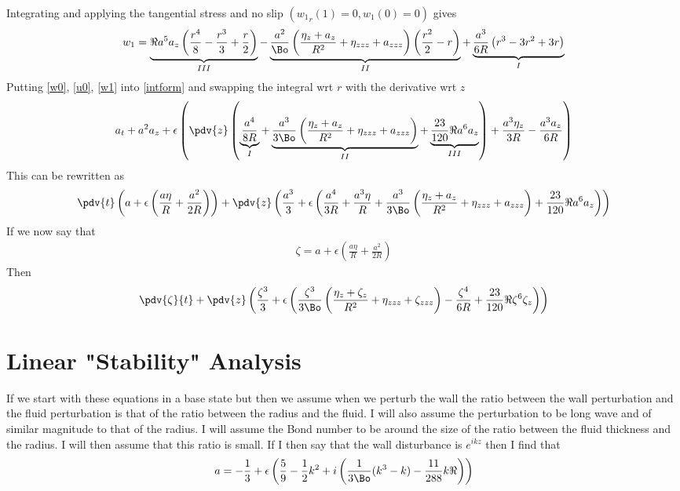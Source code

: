 \documentclass[12pt]{article}
\begin{document}
Integrating and applying the tangential stress and no slip $({w_1}_r(1)= 0, w_1(0) = 0)$ gives 
\begin{align}
w_1 = \underbrace{\Re a^5a_z\left(\frac{r^4}{8} - \frac{r^3}{3}+\frac{r}{2}\right)}_{III}-\underbrace{\frac{a^2}{\Bo}\left(\frac{\eta_z + a_z}{R^2} + \eta_{zzz} +a_{zzz}\right)\left(\frac{r^2}{2} - r\right)}_{II} + \underbrace{\frac{a^3}{6R}\left( r^3-3r^2+3r\right)}_I \label{w1}
\end{align}
 Putting \eqref{w0}, \eqref{u0},  \eqref{w1} into \eqref{intform} and swapping the integral wrt $r$ with the derivative wrt $z$
\begin{align}
a_t + a^2a_z+ \epsilon\left(\pdv{z}\left(\underbrace{\frac{a^4}{8R}}_{I}+\underbrace{ \frac{a^3}{3\Bo}\left(\frac{\eta_z + a_z}{R^2} + \eta_{zzz}+ a_{zzz}\right)}_{II}+\underbrace{\frac{23}{120}\Re a^6a_z}_{III}\right)+\frac{a^3\eta_z}{3R}- \frac{a^3 a_z}{6R}\right)
\end{align}
This can be rewritten as 
\begin{align}
\pdv{t}\left(a + \epsilon\left(\frac{a\eta}{R}+ \frac{a^2}{2R}\right)\right) + \pdv{z}\left(\frac{a^3}{3}+\epsilon\left(\frac{a^4}{3R}+\frac{a^3\eta}{R}+ \frac{a^3}{3\Bo}\left(\frac{\eta_z + a_z}{R^2} + \eta_{zzz}+ a_{zzz}\right)+\frac{23}{120}\Re a^6a_z\right)\right)
\end{align}
If we now say that \begin{align}
\zeta= a + \epsilon\left(\frac{a\eta}{R}+ \frac{a^2}{2R}\right)
\end{align}
Then
\begin{align}
\pdv{\zeta}{t}+ \pdv{z}\left(\frac{\zeta^3}{3}+\epsilon\left(\frac{\zeta^3}{3\Bo}\left(\frac{\eta_z+\zeta_z}{R^2}+\eta_{zzz}+\zeta_{zzz}\right)-\frac{\zeta^4}{6R}+\frac{23}{120}\Re\zeta^6\zeta_z\right)\right)
\end{align}

\section{Linear "Stability" Analysis} 
If we start with these equations in a base state but then we assume when we perturb the wall the ratio between the wall perturbation and the fluid perturbation is that of the ratio between the radius and the fluid. I will also assume the perturbation to be long wave and of similar magnitude to that of the radius. I will assume the Bond number to be around the size of the ratio between the fluid thickness and the radius. I will then assume that this ratio is small. If I then say that the wall disturbance is $e^{i kz}$ then I find that 
\begin{align}
a = -\frac{1}{3} + \epsilon\left(\frac{5}{9}- \frac{1}{2}k^2+ i\left(\frac{1}{3\Bo}(k^3-k)-\frac{11}{288}k\Re\right)\right)
\end{align}




\end{document}
